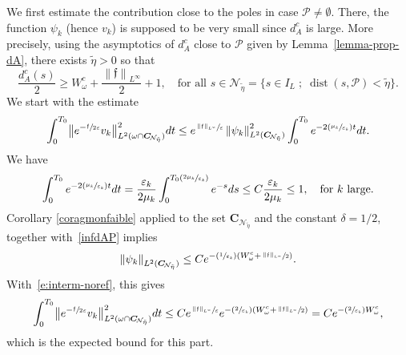 \documentclass[JEP,XML,SOM,Unicode]{cedram}
\newcommand{\Psfrac}[2]{(\sfrac{#1}{#2})}
\newcommand{\sep}{\;;\;}
\theoremstyle{definition}
\newcommand{\calN}{\ensuremath{\mathcal N}}
\newcommand{\f}{\ensuremath{\mathfrak{f}}}
\DeclareMathOperator{\dist}{dist}
\newcommand\nor[2]{\left\|#1\right\|_{#2}}
\newcommand\bnor[2]{\bigl\|#1\bigr\|_{#2}}
\newcommand{\ce}{c}
\let\e\varepsilon
\let\eps\varepsilon
\newcommand\CO[1]{\boldsymbol{C}_{\!#1}}
\begin{document}
We first estimate the contribution close to the poles in case $\mathcal{P}\neq \emptyset$. There, the function $\psi_k$ (hence $v_k$) is supposed to be very small since $d_A^{\ce}$ is large. More precisely, using the asymptotics of $d_A^{\ce}$ close to $\mathcal{P}$ given by Lemma~\ref{lemma-prop-dA}, there exists $\widetilde{\eta}>0$ so that%
\begin{equation}
\label{infdAP}
\frac{d_A^{\ce}(s)}{2}\geq W^{\ce}_{\omega}+\frac{\nor{\f}{L^{\infty}}}{2} +1,\quad \text{for all } s\in \calN_{\tilde{\eta}}=\{ s\in I_L \sep \dist(s,\mathcal{P}) < \widetilde{\eta}\}.
\end{equation}
We start with the estimate
\begin{equation}
\label{e:interm-noref}
\int_0^{T_0}\bnor{e^{-\sfrac{\f}{2\eps}}v_{k} }{L^2(\omega\cap\CO{\calN_{\tilde{\eta}}})}^2 dt\leq e^{\sfrac{\nor{\f}{L^{\infty}}}{\eps}} \nor{\psi_k }{L^2(\CO{\calN_{\tilde{\eta}}})}^2\int_0^{T_0}e^{-2\Psfrac{\mu_k}{\e_{k}} t} dt.
\end{equation}
We have
\[
\int_0^{T_0}e^{-2\Psfrac{\mu_k}{\e_{k}} t} dt=\frac{\e_{k}}{2\mu_k}\int_0^{ T_0\Psfrac{2\mu_k}{\e_{k}}}e^{- s} ds\leq C\frac{\e_{k}}{2\mu_k}\leq 1,\quad\text{for $k$ large.}
\]
Corollary \ref{coragmonfaible} applied to the set $\CO{\calN_{\tilde{\eta}}}$ and the constant $\delta=1/2$, together with~\eqref{infdAP} implies
\[
\nor{\psi_k }{L^2(\CO{\calN_{\tilde{\eta}}})}\leq C e^{-\Psfrac{1}{\e_k} (W^{\ce}_{\omega} +\sfrac{\nor{\f}{L^{\infty}}}{2})}.
\]
With~\eqref{e:interm-noref}, this gives
\[
\int_0^{T_0}\bnor{e^{-\sfrac{\f}{2\eps}}v_{k} }{L^2(\omega\cap \CO{\calN_{\tilde{\eta}}})}^2 dt
\leq C e^{\sfrac{\nor{\f}{L^{\infty}}}{\eps}}e^{-\Psfrac{2}{\e_k} (W^{\ce}_{\omega} +\sfrac{\nor{\f}{L^{\infty}}}{2})} = Ce^{-\Psfrac{2}{\e_k} W^{\ce}_{\omega}},
\]
which is the expected bound for this part.
\end{document}
